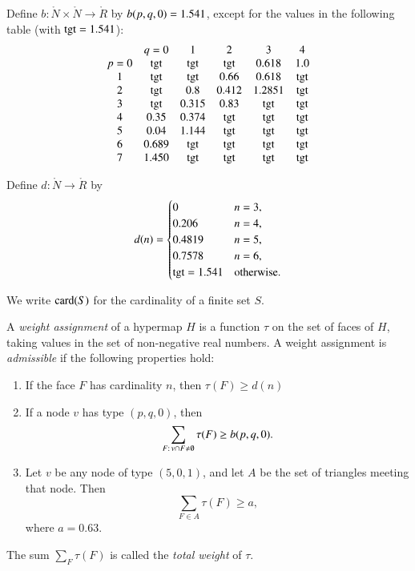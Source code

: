 \begin{definition}[b]
  Define $b:\ring{N}\times \ring{N}\to \ring{R}$ by $b(p,q,0)=1.541$,
  except for the values in the following table
  (with  ${\operatorname{tgt}}=1.541$):
  {
  \def\tx{\op{tgt}}
  $$\begin{matrix}  &q=0&1&2&3&4\\
           p=0&\tx&\tx&\tx&0.618&1.0\\
           1&\tx&\tx&0.66&0.618&\tx\\
           2&\tx&0.8&0.412&1.2851&\tx\\
           3&\tx&0.315&0.83&\tx&\tx\\
           4&0.35&0.374&\tx&\tx&\tx\\
           5&0.04&1.144&\tx&\tx&\tx\\
           6&0.689&\tx&\tx&\tx&\tx\\
           7&1.450&\tx&\tx&\tx&\tx
   \end{matrix}
   $$
   }
\end{definition}


\begin{definition}[d]
    Define $d:\ring{N}\to \ring{R}$ by
  $$d(n) = \begin{cases}
    0 & n=3, \\
    0.206 & n=4, \\
    0.4819 & n=5, \\
    0.7578 & n=6, \\
    {\operatorname{tgt}}=1.541 & \text{otherwise}.
  \end{cases}
  $$
\end{definition}


We write ${\operatorname{card}}(S)$ for the cardinality of a finite set $S$.


\begin{definition}
%
A {\it weight assignment\/} of a hypermap $H$ is a function $\tau$ on
the set of faces of $H$, taking values in the set of non-negative
real numbers. A weight assignment is {\it admissible} if the
following properties hold:
%
\begin{enumerate}
  \item If the face $F$ has cardinality $n$, then
        $\tau(F) \ge d(n)$
  \item If a node $v$ has type $(p,q,0)$, then
        $$\sum_{F:\,v\cap F\ne\emptyset} \tau(F) \ge b{(p,q,0)}.$$
        \label{admissible:b}
  \item Let $v$ be any node of type $(5,0,1)$, and let $A$ be the set of
triangles meeting that node.
        Then
        $$\sum_{F\in A} \tau(F)
            \ge  a,$$
   where $a=0.63$.
        \label{definition:admissible:excess}
\end{enumerate}
The sum $\sum_F \tau(F)$ is called the {\it total weight} of $\tau$.
\end{definition}





